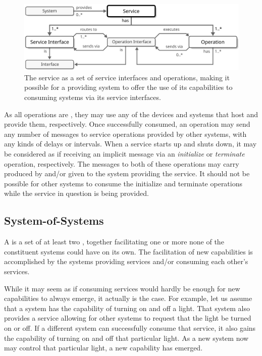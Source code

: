 \vfill

\begin{figure}[ht!]
  \centering
  \includegraphics[scale=0.9]{figures/service}
  \caption{
    The service as a set of service interfaces and operations, making it possible for a providing system to offer the use of its capabilities to consuming systems via its service interfaces.
  }
  \label{fig:service}
\end{figure}

As all operations are , they may use any  of the devices and systems that host and provide them, respectively.
Once successfully consumed, an operation may send any number of messages to service operations provided by other systems, with any kinds of delays or intervals.
When a service starts up and shuts down, it may be considered as if receiving an implicit message via an \textit{initialize} or \textit{terminate} operation, respectively.
The messages to both of these operations may carry   produced by and/or given to the system providing the service.
It should not be possible for other systems to consume the initialize and terminate operations while the service in question is being provided.

\subsection{System-of-Systems}
\label{sec:concepts:sos}

A  is a set of at least two , together facilitating one or more  none of the constituent systems could have on its own.
The facilitation of new capabilities is accomplished by the systems providing services and/or consuming each other's services.

While it may seem as if consuming services would hardly be enough for new capabilities to always emerge, it actually is the case.
For example, let us assume that a system has the capability of turning on and off a light.
That system also provides a service allowing for other systems to request that the light be turned on or off.
If a different system can successfully consume that service, it also gains the capability of turning on and off that particular light.
As a new system now may control that particular light, a new capability has emerged.

